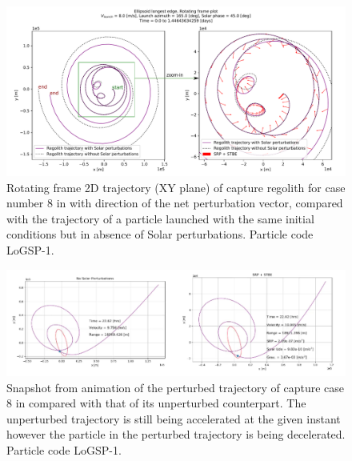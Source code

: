 \begin{figure}[htb]
\centering
\captionsetup{justification=centering}
\includegraphics[angle=90, width=\textwidth, height=\textheight, keepaspectratio=true]{longest_edge_perturbations/3.2Density_1cmSize/8ms_165Azimuth_45SolarPhase/comparative_analysis_allPerturbations_rotatingFrame_edited.pdf}
\caption{Rotating frame 2D trajectory (XY plane) of capture regolith for case number 8 in  with direction of the net perturbation vector, compared with the trajectory of a particle launched with the same initial conditions but in absence of Solar perturbations. Particle code LoGSP-1.}
\label{fig:LoGSP_1_capture_case_8_2d_trajectory_comparative_bodyFrame}
\end{figure}
\FloatBarrier
\begin{figure}[htb]
\centering
\captionsetup{justification=centering}
\includegraphics[angle=90, width=\textwidth, height=\textheight, keepaspectratio=true]{longest_edge_perturbations/3.2Density_1cmSize/8ms_165Azimuth_45SolarPhase/comparative_analysis_allPerturbations_phasing_animation_example.pdf}
\caption{Snapshot from animation of the perturbed trajectory of capture case 8 in  compared with that of its unperturbed counterpart. The unperturbed trajectory is still being accelerated at the given instant however the particle in the perturbed trajectory is being decelerated. Particle code LoGSP-1.}
\label{fig:LoGSP_1_capture_case_8_2d_trajectory_comparative_animation_phasing_snapshot}
\end{figure}

